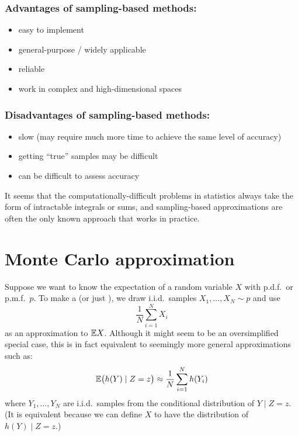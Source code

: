 \documentclass[12pt]{article}
\begin{document}
\subsubsection*{Advantages of sampling-based methods:}
\begin{itemize}
\item easy to implement
\item general-purpose / widely applicable
\item reliable
\item work in complex and high-dimensional spaces
\end{itemize}

\subsubsection*{Disadvantages of sampling-based methods:}
\begin{itemize}
\item slow (may require much more time to achieve the same level of accuracy)
\item getting ``true'' samples may be difficult
\item can be difficult to assess accuracy
\end{itemize}

It seems that the computationally-difficult problems in statistics always take the form of intractable integrals or sums, and sampling-based approximations are often the only known approach that works in practice.



\section{Monte Carlo approximation}
\label{section:Monte-Carlo}

Suppose we want to know the expectation of a random variable $X$ with p.d.f.\ or p.m.f.\ $p$. To make a  (or just ), we draw i.i.d.\ samples $X_1,\dotsc,X_N\sim p$ and use
$$\frac{1}{N}\sum_{i = 1}^N X_i$$
as an approximation to $\mathbb{E} X$. Although it might seem to be an oversimplified special case, this is in fact equivalent to seemingly more general approximations such as:
$$\mathbb{E}\big(h(Y)\mid Z=z\big)\approx \frac{1}{N}\sum_{i = 1}^N h(Y_i) $$
where $Y_1,\dotsc,Y_N$ are i.i.d.\ samples from the conditional distribution of $Y\mid Z=z$. (It is equivalent because we can define $X$ to have the distribution of $h(Y)\mid Z=z$.)
\end{document}
